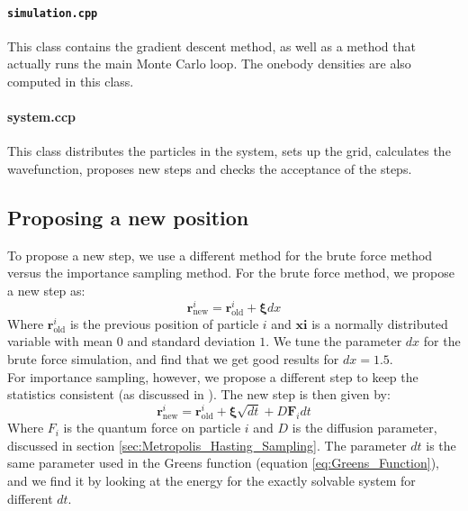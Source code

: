 \documentclass[a4paper, 10pt]{article}
\begin{document}
	\paragraph{\texttt{simulation.cpp}}
	This class contains the gradient descent method, as well as a method that actually runs the main Monte Carlo loop. The onebody densities are also computed in this class.\\
	\linebreak
	\paragraph{system.ccp}
	This class distributes the particles in the system, sets up the grid, calculates the wavefunction, proposes new steps and checks the acceptance of the steps. 
	\subsection{Proposing a new position}
	To propose a new step, we use a different method for the brute force method versus the importance sampling method. For the brute force method, we propose a new step as:
	\begin{equation}
	\boldsymbol{r}^i_{\mathrm{new}}=\boldsymbol{r}^i_{\mathrm{old}}+\boldsymbol{\xi} dx
	\end{equation}
	Where $\boldsymbol{r}^i_{\mathrm{old}}$ is the previous position of particle $i$ and $\boldsymbol{xi}$ is a normally distributed variable with mean $0$ and standard deviation $1$. We tune the parameter $dx$ for the brute force simulation, and find that we get good results for $dx=1.5$.\\
	\linebreak
	For importance sampling, however, we propose a different step to keep the statistics consistent (as discussed in \cite{Jonsson2018}). The new step is then given by:
	\begin{equation}
	\boldsymbol{r}^i_{\mathrm{new}}=\boldsymbol{r}^i_{\mathrm{old}}+\boldsymbol{\xi} \sqrt{dt}+D\boldsymbol{F}_idt
	\end{equation}
	Where $F_i$ is the quantum force on particle $i$ and $D$ is the diffusion parameter, discussed in section \ref{sec:Metropolis_Hasting_Sampling}. The parameter $dt$ is the same parameter used in the Greens function (equation \ref{eq:Greens_Function}), and we find it by looking at the energy for the exactly solvable system for different $dt$.
\end{document}
